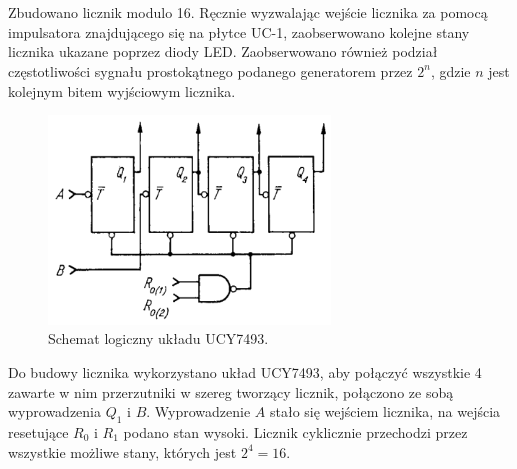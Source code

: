 \section{}
Zbudowano licznik modulo 16. Ręcznie wyzwalając wejście licznika za pomocą impulsatora znajdującego się na płytce UC-1, zaobserwowano kolejne stany licznika ukazane poprzez diody LED.
Zaobserwowano również podział częstotliwości sygnału prostokątnego podanego generatorem przez \(2^n\), gdzie \(n\) jest kolejnym bitem wyjściowym licznika.

\begin{figure}[H]
    \centering
    \includegraphics[width=7.5cm]{include/5/1.png}
    \caption{Schemat logiczny układu UCY7493.}
\end{figure}

Do budowy licznika wykorzystano układ UCY7493, aby połączyć wszystkie 4 zawarte w nim przerzutniki w szereg tworzący licznik, połączono ze sobą wyprowadzenia \(Q_1\) i \(B\). Wyprowadzenie \(A\) stało się wejściem licznika, na wejścia resetujące \(R_0\) i \(R_1\) podano stan wysoki. Licznik cyklicznie przechodzi przez wszystkie możliwe stany, których jest \(2^4=16\).